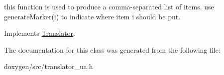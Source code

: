 this function is used to produce a comma-\/separated list of items. use generate\+Marker(i) to indicate where item i should be put. 

Implements \mbox{\hyperlink{class_translator}{Translator}}.



The documentation for this class was generated from the following file\+:\begin{DoxyCompactItemize}
\item 
doxygen/src/translator\+\_\+ua.\+h\end{DoxyCompactItemize}

